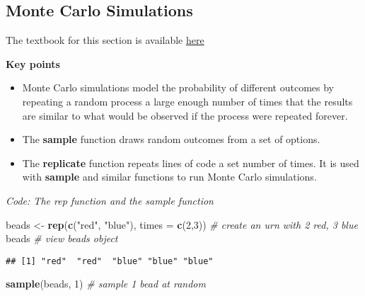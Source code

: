 \documentclass[
]{article}
\newenvironment{Shaded}{\begin{snugshade}}{\end{snugshade}}
\newcommand{\CommentTok}[1]{\textcolor[rgb]{0.56,0.35,0.01}{\textit{#1}}}
\newcommand{\DataTypeTok}[1]{\textcolor[rgb]{0.13,0.29,0.53}{#1}}
\newcommand{\DecValTok}[1]{\textcolor[rgb]{0.00,0.00,0.81}{#1}}
\newcommand{\KeywordTok}[1]{\textcolor[rgb]{0.13,0.29,0.53}{\textbf{#1}}}
\newcommand{\NormalTok}[1]{#1}
\newcommand{\StringTok}[1]{\textcolor[rgb]{0.31,0.60,0.02}{#1}}
\providecommand{\tightlist}{%
  \setlength{\itemsep}{0pt}\setlength{\parskip}{0pt}}
\begin{document}
\hypertarget{monte-carlo-simulations}{%
\subsection{Monte Carlo Simulations}\label{monte-carlo-simulations}}

The textbook for this section is available
\href{https://rafalab.github.io/dsbook/probability.html\#monte-carlo-simulations}{here}

\textbf{Key points}

\begin{itemize}
\tightlist
\item
  Monte Carlo simulations model the probability of different outcomes by
  repeating a random process a large enough number of times that the
  results are similar to what would be observed if the process were
  repeated forever.
\item
  The \textbf{sample} function draws random outcomes from a set of
  options.
\item
  The \textbf{replicate} function repeats lines of code a set number of
  times. It is used with \textbf{sample} and similar functions to run
  Monte Carlo simulations.
\end{itemize}

\emph{Code: The rep function and the sample function}

\begin{Shaded}
\begin{Highlighting}[]
\NormalTok{beads <-}\StringTok{ }\KeywordTok{rep}\NormalTok{(}\KeywordTok{c}\NormalTok{(}\StringTok{"red"}\NormalTok{, }\StringTok{"blue"}\NormalTok{), }\DataTypeTok{times =} \KeywordTok{c}\NormalTok{(}\DecValTok{2}\NormalTok{,}\DecValTok{3}\NormalTok{))    }\CommentTok{# create an urn with 2 red, 3 blue}
\NormalTok{beads    }\CommentTok{# view beads object}
\end{Highlighting}
\end{Shaded}

\begin{verbatim}
## [1] "red"  "red"  "blue" "blue" "blue"
\end{verbatim}

\begin{Shaded}
\begin{Highlighting}[]
\KeywordTok{sample}\NormalTok{(beads, }\DecValTok{1}\NormalTok{)    }\CommentTok{# sample 1 bead at random}
\end{Highlighting}
\end{Shaded}
\end{document}
